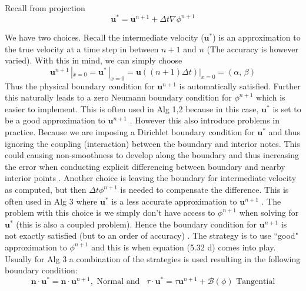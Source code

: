 Recall from projection 
\begin{equation*}
\textbf{u}^* = \textbf{u}^{n+1} + \Delta t \nabla \phi^{n+1}
\end{equation*}

We have two choices. Recall the intermediate velocity ($\textbf{u}^*$) is an approximation to the true velocity at a time step in between $n+1$ and $n$ (The accuracy is however varied). With this in mind, we can simply choose
\begin{equation*}
\textbf{u}^{n+1} \,|_{x = 0} = \textbf{u}^* \,|_{x = 0} = \textbf{u} ((n+1) \Delta t) |_{x=0} = (\alpha, \, \beta)
\end{equation*}
Thus the physical boundary condition for $\textbf{u}^{n+1}$ is automatically satisfied. Further this naturally leads to a zero Neumann boundary condition for $\phi^{n+1}$ which is easier to implement. This is often used in Alg 1,2 because in this case, $\textbf{u}^*$ is set to be a good approximation to $\textbf{u}^{n+1}$ \cite{brown2001accurate,strikwerda1999accuracy}. However this also introduce problems in practice. Because we are imposing a Dirichlet boundary condition for $\textbf{u}^*$ and thus ignoring the coupling (interaction) between the boundary and interior notes. This could causing non-smoothness to develop along the boundary and thus increasing the error when conducting explicit differencing between boundary and nearby interior points \cite{brown2001accurate}. Another choice is leaving the boundary for intermediate velocity as computed, but then $\Delta t \phi^{n+1}$ is needed to compensate the difference.  This is often used in Alg 3 where $\textbf{u}^*$ is a less accurate approximation to $\textbf{u}^{n+1}$ \cite{kim1985application,brown2001accurate,strikwerda1999accuracy}. The problem with this choice is we simply don't have access to $\phi^{n+1}$ when solving for $\textbf{u}^*$ (this is also a coupled problem). Hence the boundary condition for $\textbf{u}^{n+1}$ is not exactly satisfied (but to an order of accuracy) \cite{strikwerda1999accuracy}. The strategy is to use ``good" approximation to $\phi^{n+1}$ and this is when equation (5.32 d) comes into play. Usually for Alg 3 a combination of the strategies is used resulting in the following boundary condition:
\begin{equation*}
\textbf{n} \cdot \textbf{u}^* = \textbf{n} \cdot \textbf{u}^{n+1}, \text{ Normal and } \, \, \, \textbf{$\tau$} \cdot \textbf{u}^* = \textbf{$\tau$} \textbf{u}^{n+1} + \mathcal{B} (\phi) \text{ Tangential}
\end{equation*}


